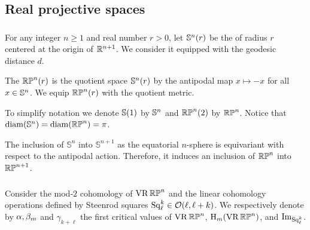 
\subsection{Real projective spaces} \label{sub:first_critical_value_rpn}

\subsubsection{}

For any integer $n \geq 1$ and real number $r > 0$, let $\mathbb{S}^n(r)$ be the  of radius $r$ centered at the origin of $\mathbb{R}^{n+1}$.
We consider it equipped with the geodesic distance $d$.

The  $\mathbb{RP}^n(r)$ is the quotient space $\mathbb{S}^n(r)$ by the antipodal map $x \mapsto -x$ for all $x \in \mathbb{S}^n$.
We equip $\mathbb{RP}^n(r)$ with the quotient metric.

To simplify notation we denote $\mathbb{S}(1)$ by $\mathbb{S}^n$ and $\mathbb{RP}^n(2)$ by $\mathbb{RP}^n$.
Notice that $\operatorname{diam}(\mathbb{S}^n) = \operatorname{diam}(\mathbb{RP}^n) = \pi$.

The inclusion of \(\mathbb{S}^n\) into \(\mathbb{S}^{n+1}\) as the equatorial $n$-sphere is equivariant with respect to the antipodal action.
Therefore, it induces an inclusion of \(\mathbb{RP}^n\) into \(\mathbb{RP}^{n+1}\).


\subsubsection{}\label{sub:barcode_rpn}

Consider the mod-\(2\) cohomology of \(\operatorname{VR}\mathbb{RP}^n\) and the linear cohomology operations defined by Steenrod squares \(\operatorname{Sq}^k_\ell \in \mathcal{O}(\ell,\ell+k)\).
We respectively denote by $\alpha, \beta_m$ and $\gamma_{k + \ell}$ the first critical values of \(\operatorname{VR}\mathbb{RP}^n\), \(\mathrm{H}_m(\operatorname{VR}\mathbb{RP}^n)\), and \(\operatorname{Im}_{\operatorname{Sq}^k_\ell}\).

